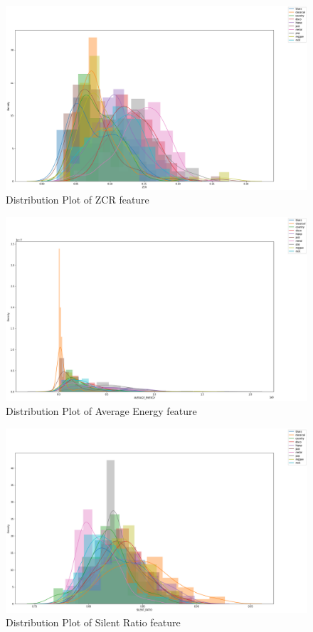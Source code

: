\documentclass[12pt]{article}
\begin{document}
	\begin{figure}[H]
		\hspace{40pt}\includegraphics[scale=0.55]{visual_4_1}
		\caption{Distribution Plot of ZCR feature}
	\end{figure}
	
	\begin{figure}[H]
		\hspace{40pt}\includegraphics[scale=0.55]{visual_5_1}
		\caption{Distribution Plot of Average Energy feature}
	\end{figure}
	
	\begin{figure}[H]
		\hspace{40pt}\includegraphics[scale=0.55]{visual_6_1}
		\caption{Distribution Plot of Silent Ratio feature}
	\end{figure}
\end{document}
